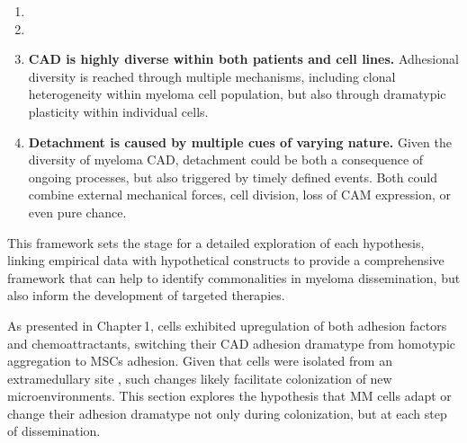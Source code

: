 \newcommand{\cadddiversity}{%
      \textbf{\ac{CAD} is highly diverse within both patients and cell lines.} Adhesional
      diversity is reached through multiple mechanisms, including clonal
      heterogeneity within myeloma cell population, but also through dramatypic
      plasticity within individual cells.%
}%
\newcommand{\cadddiversitytitle}{ %
      \textit{Hypothesis 3}: CAD is Highly Diverse Within both Patients
      and Cell Lines%
}%


\newcommand{\caddtrigger}{%
      \textbf{Detachment is caused by multiple cues of varying nature.} Given
      the diversity of myeloma \ac{CAD}, detachment could be both a consequence
      of ongoing processes, but also triggered by timely defined events. Both
      could combine external mechanical forces, cell division, loss
      of \ac{CAM} expression, or even pure chance. }%
\newcommand{\caddtriggertitle}{ %
      \textit{Hypothesis 4}: Detachment is Caused by Multiple Cues of Varying
      Nature %
}%



\begin{enumerate}[parsep=4pt]
      \item \caddramatype
      \item \cadplasticity
      \item \cadddiversity
      \item \caddtrigger
\end{enumerate}


This framework sets the stage for a detailed exploration of each hypothesis,
linking empirical data with hypothetical constructs to provide a comprehensive
framework that can help to identify commonalities in myeloma dissemination, but
also inform the development of targeted therapies.




\unnsubsection{\caddramatypetitle}%
\label{sec:discussion_caddadaptation}%
As presented in Chapter\,1, \MAina cells exhibited upregulation of both adhesion
factors and chemoattractants, switching their \ac{CAD} adhesion dramatype
from homotypic aggregation to \acp{MSC} adhesion. Given that \INA cells were
isolated from an extramedullary site 
\cite{burgerGp130RasMediated2001}, such changes likely facilitate colonization
of new microenvironments. This section explores the hypothesis that MM cells
adapt or change their adhesion dramatype not only during colonization, but at
each step of dissemination.


